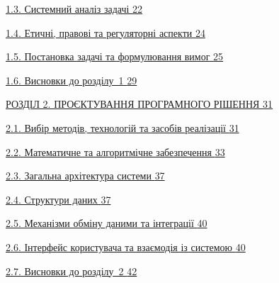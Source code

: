 \documentclass[
]{article}
\begin{document}
\hyperref[ux441ux438ux441ux442ux435ux43cux43dux438ux439-ux430ux43dux430ux43bux456ux437-ux437ux430ux434ux430ux447ux456]{1.3.
Системний аналіз задачі
\hyperref[ux441ux438ux441ux442ux435ux43cux43dux438ux439-ux430ux43dux430ux43bux456ux437-ux437ux430ux434ux430ux447ux456]{22}}

\hyperref[ux435ux442ux438ux447ux43dux456-ux43fux440ux430ux432ux43eux432ux456-ux442ux430-ux440ux435ux433ux443ux43bux44fux442ux43eux440ux43dux456-ux430ux441ux43fux435ux43aux442ux438]{1.4.
Етичні, правові та регуляторні аспекти
\hyperref[ux435ux442ux438ux447ux43dux456-ux43fux440ux430ux432ux43eux432ux456-ux442ux430-ux440ux435ux433ux443ux43bux44fux442ux43eux440ux43dux456-ux430ux441ux43fux435ux43aux442ux438]{24}}

\hyperref[ux43fux43eux441ux442ux430ux43dux43eux432ux43aux430-ux437ux430ux434ux430ux447ux456-ux442ux430-ux444ux43eux440ux43cux443ux43bux44eux432ux430ux43dux43dux44f-ux432ux438ux43cux43eux433]{1.5.
Постановка задачі та формулювання вимог
\hyperref[ux43fux43eux441ux442ux430ux43dux43eux432ux43aux430-ux437ux430ux434ux430ux447ux456-ux442ux430-ux444ux43eux440ux43cux443ux43bux44eux432ux430ux43dux43dux44f-ux432ux438ux43cux43eux433]{25}}

\hyperref[ux432ux438ux441ux43dux43eux432ux43aux438-ux434ux43e-ux440ux43eux437ux434ux456ux43bux443-1]{1.6.
Висновки до розділу~1
\hyperref[ux432ux438ux441ux43dux43eux432ux43aux438-ux434ux43e-ux440ux43eux437ux434ux456ux43bux443-1]{29}}

\hyperref[_Toc228121443]{РОЗДІЛ 2. ПРОЄКТУВАННЯ ПРОГРАМНОГО РІШЕННЯ
\hyperref[_Toc228121443]{31}}

\hyperref[_Toc228121444]{2.1. Вибір методів, технологій та засобів
реалізації \hyperref[_Toc228121444]{31}}

\hyperref[_Toc228121450]{2.2. Математичне та алгоритмічне забезпечення
\hyperref[_Toc228121450]{33}}

\hyperref[_Toc228121457]{2.3. Загальна архітектура системи
\hyperref[_Toc228121457]{37}}

\hyperref[_Toc228121462]{2.4. Структури даних
\hyperref[_Toc228121462]{37}}

\hyperref[_Toc228121469]{2.5. Механізми обміну даними та інтеграції
\hyperref[_Toc228121469]{40}}

\hyperref[_Toc228121473]{2.6. Інтерфейс користувача та взаємодія із
системою \hyperref[_Toc228121473]{40}}

\hyperref[_Toc228121478]{2.7. Висновки до розділу~2
\hyperref[_Toc228121478]{42}}
\end{document}
